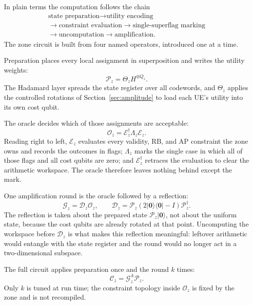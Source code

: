 \documentclass[journal]{IEEEtran}
\newcommand{\calC}{\mathcal{C}}  %
\newcommand{\calP}{\mathcal{P}}  %
\newcommand{\calO}{\mathcal{O}}  %
\newcommand{\calE}{\mathcal{E}}  %
\newcommand{\calD}{\mathcal{D}}  %
\newcommand{\calG}{\mathcal{G}}  %
\newcommand{\ket}[1]{\lvert #1 \rangle}
\newcommand{\bra}[1]{\langle #1 \rvert}
\begin{document}
In plain terms the computation follows the chain
\[
\begin{gathered}
\text{state preparation}
\rightarrow
\text{utility encoding}\\
\rightarrow
\text{constraint evaluation}
\rightarrow
\text{single-superflag marking}\\
\rightarrow
\text{uncomputation}
\rightarrow
\text{amplification}.
\end{gathered}
\]
The zone circuit is built from four named operators, introduced one at a time.

Preparation places every local assignment in superposition and writes the utility weights:
\begin{equation}
\label{eq:op-prep}
\calP_z=\Theta_z H^{\otimes Q_z}.
\end{equation}
The Hadamard layer spreads the state register over all codewords, and $\Theta_z$ applies the controlled rotations of Section~\ref{sec:amplitude} to load each UE's utility into its own cost qubit.

The oracle decides which of those assignments are acceptable:
\begin{equation}
\label{eq:op-oracle}
\calO_z=\calE_z^{\dagger}\Lambda_z\calE_z.
\end{equation}
Reading right to left, $\calE_z$ evaluates every validity, RB, and AP constraint the zone owns and records the outcomes in flags; $\Lambda_z$ marks the single case in which all of those flags and all cost qubits are zero; and $\calE_z^{\dagger}$ retraces the evaluation to clear the arithmetic workspace. The oracle therefore leaves nothing behind except the mark.

One amplification round is the oracle followed by a reflection:
\begin{equation}
\label{eq:op-round}
\calG_z=\calD_z\calO_z,
\qquad
\calD_z=\calP_z\left(2\ket{\bm 0}\bra{\bm 0}-I\right)\calP_z^{\dagger}.
\end{equation}
The reflection is taken about the prepared state $\calP_z\ket{\bm 0}$, not about the uniform state, because the cost qubits are already rotated at that point. Uncomputing the workspace before $\calD_z$ is what makes this reflection meaningful: leftover arithmetic would entangle with the state register and the round would no longer act in a two-dimensional subspace.

The full circuit applies preparation once and the round $k$ times:
\begin{equation}
\label{eq:circuit-chain}
\calC_z=\calG_z^{\,k}\calP_z .
\end{equation}
Only $k$ is tuned at run time; the constraint topology inside $\calO_z$ is fixed by the zone and is not recompiled.
\end{document}
